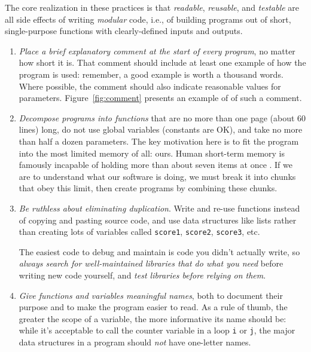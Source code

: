 \documentclass[10pt]{article}
\newcommand{\recommend}[1]{\textit{#1}}
\begin{document}
The core realization in these practices is that \emph{readable},
\emph{reusable}, and \emph{testable} are all side effects of writing
\emph{modular} code, i.e., of building programs out of short,
single-purpose functions with clearly-defined inputs and outputs.

\begin{enumerate}

\item
  \recommend{Place a brief explanatory comment at the start of every
    program}, no matter how short it is. That comment should include
  at least one example of how the program is used: remember, a good
  example is worth a thousand words. Where possible, the comment
  should also indicate reasonable values for parameters.
  Figure~\ref{fig:comment} presents an example of of such a comment.

\item
  \recommend{Decompose programs into functions} that are no more than
  one page (about 60 lines) long, do not
  use global variables (constants are OK), and take no more than half
  a dozen parameters.  The key motivation here is to fit the program
  into the most limited memory of all: ours. Human short-term memory
  is famously incapable of holding more than about seven items at 
  once \cite{miller1956}. If we are to understand
  what our software is doing, we must break it into chunks that obey
  this limit, then create programs by combining these chunks.

\item
  \recommend{Be ruthless about eliminating duplication}. Write and
  re-use functions instead of copying and pasting source code, and use
  data structures like lists rather than creating lots of variables
  called \texttt{score1}, \texttt{score2}, \texttt{score3}, etc.

  The easiest code to debug and maintain is code you didn't
  actually write, so \recommend{always search for well-maintained
    libraries that do what you need} before writing new code yourself,
  and \recommend{test libraries before relying on them}.

\item
  \recommend{Give functions and variables meaningful names}, both to
  document their purpose and to make the program easier to read. As a
  rule of thumb, the greater the scope of a variable, the more
  informative its name should be: while it's acceptable to call the
  counter variable in a loop \texttt{i} or \texttt{j}, the major data
  structures in a program should \emph{not} have one-letter names.


\end{enumerate}
\end{document}
